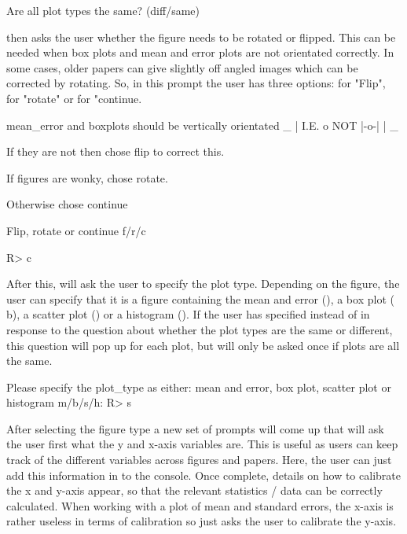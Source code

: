 \documentclass[article]{jss}
\newcommand{\fct}[1]{\code{#1()}}
\begin{document}
\begin{CodeChunk}
\begin{CodeOutput}
Are all plot types the same? (diff/same)
\end{CodeOutput}
\end{CodeChunk}

\fct{metaDigitise} then asks the user whether the figure needs to be rotated or flipped. This can be needed when box plots and mean and error plots are not orientated correctly. In some cases, older papers can give slightly off angled images which can be corrected by rotating. So, in this prompt the user has three options:  for "Flip",  for "rotate" or  for "continue. 

\begin{CodeChunk}
\begin{CodeOutput}
mean_error and boxplots should be vertically orientated
       _ 
       |  
  I.E. o    NOT  |-o-|
       |
       _

If they are not then chose flip to correct this.

If figures are wonky, chose rotate.

Otherwise chose continue

Flip, rotate or continue f/r/c 
\end{CodeOutput}
\begin{CodeInput}
R> c
\end{CodeInput}
\end{CodeChunk}

After this, \fct{metaDigitise} will ask the user to specify the plot type. Depending on the figure, the user can specify that it is a figure containing the mean and error (), a box plot (\code
{b}), a scatter plot () or a histogram (). If the user has specified  instead of  in response to the question about whether the plot types are the same or different, this question will pop up for each plot, but will only be asked once if plots are all the same.

\begin{CodeChunk}
\begin{CodeOutput}
Please specify the plot_type as either: mean and error, box plot,
 scatter plot or histogram m/b/s/h:
 R> s
\end{CodeOutput}
\end{CodeChunk}

After selecting the figure type a new set of prompts will come up that will ask the user first what the y and x-axis variables are. This is useful as users can keep track of the different variables across figures and papers. Here, the user can just add this information in to the  console. Once complete, details on how to calibrate the x and y-axis appear, so that the relevant statistics / data can be correctly calculated. When working with a plot of mean and standard errors, the x-axis is rather useless in terms of calibration so  just asks the user to calibrate the y-axis. 
\end{document}
